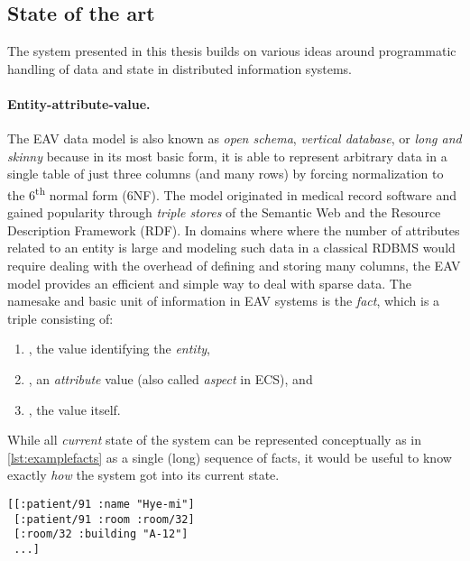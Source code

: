 \subsection{State of the art}\label{sec:sota}

The system presented in this thesis builds on various ideas around programmatic handling of data and state in distributed information systems.

\paragraph{Entity-attribute-value.}

The EAV data model is also known as \emph{open schema}, \emph{vertical database}, or \emph{long and skinny} \cite{jastrow2015entity} because in its most basic form, it is able to represent arbitrary data in a single table of just three columns (and many rows) by forcing normalization to the 6\textsuperscript{th} normal form (6NF). The model originated in medical record software \cite{huff1994help} and gained popularity through \emph{triple stores} of the Semantic Web and the Resource Description Framework (RDF). In domains where where the number of attributes related to an entity is large and modeling such data in a classical \gls{RDBMS} would require dealing with the overhead of defining and storing many columns, the EAV model provides an efficient and simple way to deal with sparse data. The namesake and basic unit of information in EAV systems is the \emph{fact}, which is a triple \lisp{[e a v]} consisting of:

\begin{enumerate}[nolistsep,label={(\roman*)}]
  \item {}, the value identifying the \emph{entity},
  \item {}, an \emph{attribute} value (also called \emph{aspect} in \gls{ECS}), and
  \item {}, the value itself.
\end{enumerate}

While all \emph{current} state of the system can be represented conceptually as in  \autoref{lst:examplefacts} as a single (long) sequence of facts, it would be useful to know exactly \emph{how} the system got into its current state.

\begin{lstlisting}[label={lst:examplefacts},morekeywords={email-source,contacts-source},caption=A sequence of EAV facts]
[[:patient/91 :name "Hye-mi"]
 [:patient/91 :room :room/32]
 [:room/32 :building "A-12"]
 ...]
\end{lstlisting}

